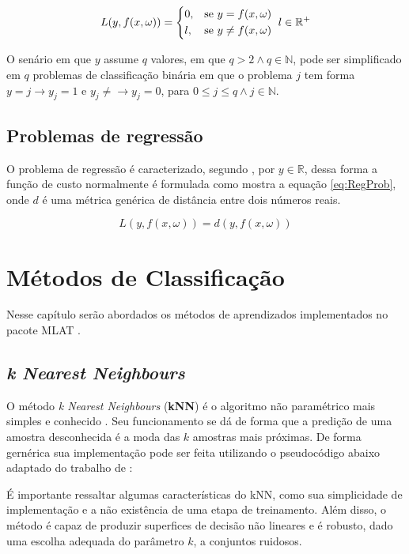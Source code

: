 \begin{equation}
{	
	 L(y, f(x, \omega)) = \begin{dcases*}
	0,  & se $y = f(x, \omega)$ \\
	l,  & se $y \ne f(x, \omega)$ 
	\end{dcases*} \\ 
	l \in \mathbb {R^+}
}
\label{eq:ClassProb}
\end{equation}

O senário em que $y$ assume $q$ valores, em que $q > 2 \land q \in \mathbb {N}$, pode ser simplificado em $q$ problemas de classificação binária em que o problema $j$ tem forma $y = j \rightarrow y_j = 1$ e $y_j \neq  \rightarrow y_j = 0 $, para $ 0 \leq j \leq q \land j \in \mathbb {N}$.

\subsection{Problemas de regressão}
O problema de regressão é caracterizado, segundo , por $y \in \mathbb {R}$, dessa forma a função de custo normalmente é formulada como mostra a equação \ref{eq:RegProb}, onde $d$ é uma métrica genérica de distância entre dois números reais.

\begin{equation}
L(y, f(x, \omega)) = d(y, f(x, \omega))
\label{eq:RegProb}
\end{equation}

\section{Métodos de Classificação} 
Nesse capítulo serão abordados os métodos de aprendizados implementados no pacote MLAT \cite{PauloCirinoMLAT}. 

\subsection{\textit{k Nearest Neighbours}}
O método \textit{k Nearest Neighbours} (\textbf{kNN}) é o algoritmo não paramétrico mais simples e conhecido \cite{James20131} . Seu funcionamento se dá de forma que a predição de uma amostra desconhecida é a moda das $k$ amostras mais próximas. De forma gernérica sua implementação pode ser feita utilizando o pseudocódigo abaixo adaptado do trabalho de  :

 

É importante ressaltar algumas características do kNN, como sua simplicidade de implementação e a não existência de uma etapa de treinamento. Além disso, o método é capaz de produzir superfices de decisão não lineares e é robusto, dado uma escolha adequada do parâmetro $k$, a conjuntos ruidosos.

